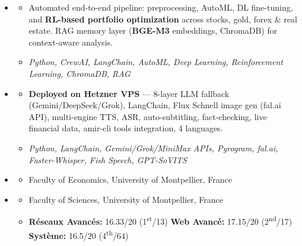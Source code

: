 \documentclass[11pt,a4paper]{article}
\renewcommand{\itemspace}{\vspace{0.25em}}
\begin{document}
\begin{itemize}[leftmargin=1em, label={}]
    \item
    \begin{itemize}[leftmargin=1.5em, label=$\bullet$, nosep]
        \item Automated end-to-end pipeline: preprocessing, AutoML, DL fine-tuning, and \textbf{RL-based portfolio optimization} across stocks, gold, forex \& real estate. RAG memory layer (\textbf{BGE-M3} embeddings, ChromaDB) for context-aware analysis.
        \item \emph{Python, CrewAI, LangChain, AutoML, Deep Learning, Reinforcement Learning, ChromaDB, RAG}
    \end{itemize}

    \itemspace
    \item
    \begin{itemize}[leftmargin=1.5em, label=$\bullet$, nosep]
        \item \textbf{Deployed on Hetzner VPS} — 8-layer LLM fallback (Gemini/DeepSeek/Grok), LangChain, Flux Schnell image gen (fal.ai API), multi-engine TTS, ASR, auto-subtitling, fact-checking, live financial data, amir-cli tools integration, 4 languages.
        \item \emph{Python, LangChain, Gemini/Grok/MiniMax APIs, Pyrogram, fal.ai, Faster-Whisper, Fish Speech, GPT-SoVITS}
    \end{itemize}

\end{itemize}

\begin{itemize}[leftmargin=1em, label={}]
    \item
    \begin{itemize}[leftmargin=1.5em, label=$\bullet$, nosep]
        \item Faculty of Economics, University of Montpellier, France
    \end{itemize}

    \itemspace
    \item
    \begin{itemize}[leftmargin=1.5em, label=$\bullet$, nosep]
        \item Faculty of Sciences, University of Montpellier, France
        \item \textbf{R\'{e}seaux Avanc\'{e}s:} 16.33/20 (1\textsuperscript{st}/13) \quad \textbf{Web Avanc\'{e}:} 17.15/20 (2\textsuperscript{nd}/17) \quad \textbf{Syst\`{e}me:} 16.5/20 (4\textsuperscript{th}/64)
    \end{itemize}
\end{itemize}
\end{document}

